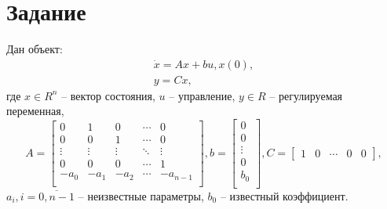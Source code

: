 \documentclass[14pt, a4paper]{extarticle}
\begin{document}
	\onehalfspacing
	
	\setcounter{page}{2}
	
	\section*{Задание}
	
	Дан объект:
	$$\begin{matrix}
		\dot{x} = Ax + bu, x(0),\\
		y = Cx,
	\end{matrix}$$
	где $x\in R^n$ -- вектор состояния, $u$ -- управление, $y \in R$ -- регулируемая переменная,
	$$A=\left[\begin{matrix}
		0 & 1 & 0 & \cdots & 0 \\
		0 & 0 & 1 & \cdots & 0 \\
		\vdots & \vdots & \vdots & \ddots & \vdots \\
		0 & 0 & 0 & \cdots & 1 \\
		-a_0 & -a_1 & -a_2 & \cdots & -a_{n-1} \\
	\end{matrix}\right], b = \left[\begin{matrix}
		0 \\ 0 \\ \vdots \\ 0 \\ b_0 \\
	\end{matrix}\right], C = \left[\begin{matrix}
		1 & 0 & \cdots & 0 & 0
	\end{matrix}\right],$$
	$a_i, i=\overline{0,n-1}$ -- неизвестные параметры, $b_0$ -- известный коэффициент.
	
\end{document}
